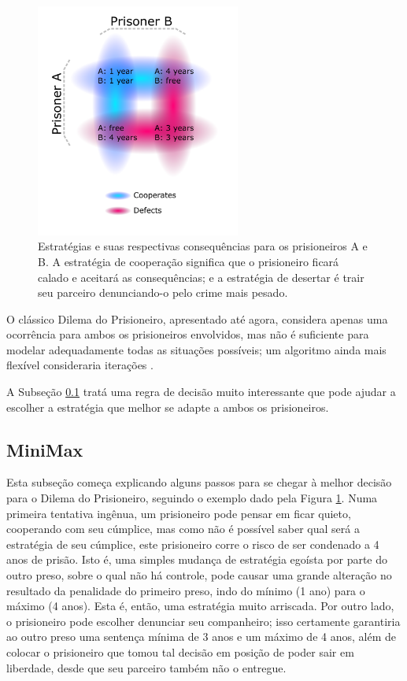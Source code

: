 \begin{figure}[H]
    \centering
    \includegraphics[width=0.60\textwidth]{figs/gan_prisoners_dilemma.pdf}
    \caption{Estratégias e suas respectivas consequências para os prisioneiros A e B. A estratégia de cooperação significa que o prisioneiro ficará calado e aceitará as consequências; e a estratégia de desertar é trair seu parceiro denunciando-o pelo crime mais pesado.}
    \label{fig:prisoners_dilemma}
\end{figure}

O clássico Dilema do Prisioneiro, apresentado até agora, considera apenas uma ocorrência para ambos os prisioneiros envolvidos, mas não é suficiente para modelar adequadamente todas as situações possíveis; um algoritmo ainda mais flexível consideraria iterações \citep{press2012iterated}.

A Subseção \ref{subsec:gan_minmax} tratá uma regra de decisão muito interessante que pode ajudar a escolher a estratégia que melhor se adapte a ambos os prisioneiros.




\subsection{MiniMax}
\label{subsec:gan_minmax}

Esta subseção começa explicando alguns passos para se chegar à melhor decisão para o Dilema do Prisioneiro, seguindo o exemplo dado pela Figura \ref{fig:prisoners_dilemma}. Numa primeira tentativa ingênua, um prisioneiro pode pensar em ficar quieto, cooperando com seu cúmplice, mas como não é possível saber qual será a estratégia de seu cúmplice, este prisioneiro corre o risco de ser condenado a 4 anos de prisão. Isto é, uma simples mudança de estratégia egoísta por parte do outro preso, sobre o qual não há controle, pode causar uma grande alteração no resultado da penalidade do primeiro preso, indo do mínimo (1 ano) para o máximo (4 anos). Esta é, então, uma estratégia muito arriscada. Por outro lado, o prisioneiro pode escolher denunciar seu companheiro; isso certamente garantiria ao outro preso uma sentença mínima de 3 anos e um máximo de 4 anos, além de colocar o prisioneiro que tomou tal decisão em posição de poder sair em liberdade, desde que seu parceiro também não o entregue.

